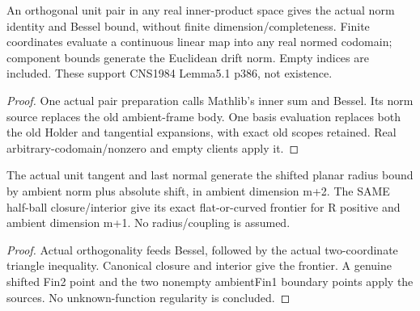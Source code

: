\begin{lemma}
  \label{lem:orthogonal-frame-coordinates}
  \leanok
  An orthogonal unit pair in any real inner-product space gives the actual
  norm identity and Bessel bound, without finite dimension/completeness.
  Finite coordinates evaluate a continuous linear map into any real normed
  codomain; component bounds generate the Euclidean drift norm. Empty indices
  are included. These support CNS1984 Lemma5.1 p386, not existence.
\end{lemma}
\begin{proof}
  \leanok
  One actual pair preparation calls Mathlib's inner sum and Bessel.
  Its norm source replaces the old ambient-frame body. One basis evaluation
  replaces both the old Holder and tangential expansions, with exact old
  scopes retained. Real arbitrary-codomain/nonzero and empty clients apply it.
\end{proof}

\begin{lemma}
  \label{lem:halfball-radius-frontier}
  \leanok
  The actual unit tangent and last normal generate the shifted planar radius
  bound by ambient norm plus absolute shift, in ambient dimension m+2.
  The SAME half-ball closure/interior give its exact flat-or-curved frontier
  for R positive and ambient dimension m+1. No radius/coupling is assumed.
\end{lemma}
\begin{proof}
  \leanok
  Actual orthogonality feeds Bessel, followed by the actual two-coordinate
  triangle inequality. Canonical closure and interior give the frontier.
  A genuine shifted Fin2 point and the two nonempty ambientFin1 boundary
  points apply the sources. No unknown-function regularity is concluded.
\end{proof}

